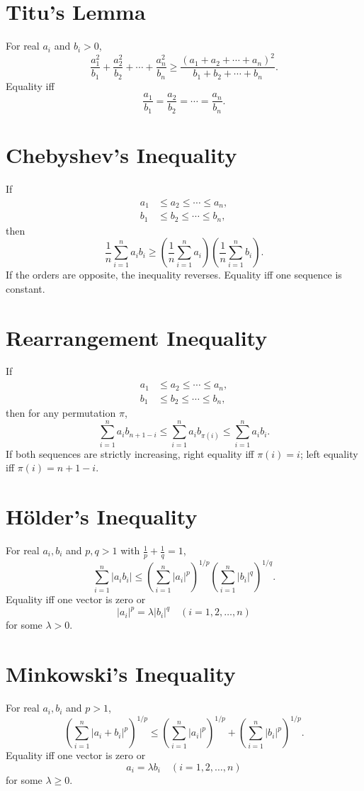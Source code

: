 \documentclass[11pt]{article}
\begin{document}
\section*{Titu's Lemma}
For real $a_i$ and $b_i>0$,
\[
    \frac{a_1^2}{b_1}+\frac{a_2^2}{b_2}+\cdots+\frac{a_n^2}{b_n}
    \geq
    \frac{(a_1+a_2+\cdots+a_n)^2}{b_1+b_2+\cdots+b_n}.
\]
Equality iff
\[
    \frac{a_1}{b_1}=\frac{a_2}{b_2}=\cdots=\frac{a_n}{b_n}.
\]

\section*{Chebyshev's Inequality}
If
\[
    \begin{aligned}
        a_1&\leq a_2\leq \cdots\leq a_n,\\
        b_1&\leq b_2\leq \cdots\leq b_n,
    \end{aligned}
\]
then
\[
    \frac{1}{n}\sum_{i=1}^n a_ib_i
    \geq
    \left(\frac{1}{n}\sum_{i=1}^n a_i\right)
    \left(\frac{1}{n}\sum_{i=1}^n b_i\right).
\]
If the orders are opposite, the inequality reverses. Equality iff one sequence is constant.

\section*{Rearrangement Inequality}
If
\[
    \begin{aligned}
        a_1&\leq a_2\leq \cdots\leq a_n,\\
        b_1&\leq b_2\leq \cdots\leq b_n,
    \end{aligned}
\]
then for any permutation $\pi$,
\[
    \sum_{i=1}^n a_ib_{n+1-i}
    \leq
    \sum_{i=1}^n a_ib_{\pi(i)}
    \leq
    \sum_{i=1}^n a_ib_i.
\]
If both sequences are strictly increasing, right equality iff $\pi(i)=i$; left equality iff $\pi(i)=n+1-i$.

\section*{H\"older's Inequality}
For real $a_i,b_i$ and $p,q>1$ with $\frac{1}{p}+\frac{1}{q}=1$,
\[
    \sum_{i=1}^n |a_ib_i|
    \leq
    \left(\sum_{i=1}^n |a_i|^p\right)^{1/p}
    \left(\sum_{i=1}^n |b_i|^q\right)^{1/q}.
\]
Equality iff one vector is zero or
\[
    |a_i|^p=\lambda |b_i|^q \quad (i=1,2,\ldots,n)
\]
for some $\lambda>0$.

\section*{Minkowski's Inequality}
For real $a_i,b_i$ and $p>1$,
\[
    \left(\sum_{i=1}^n |a_i+b_i|^p\right)^{1/p}
    \leq
    \left(\sum_{i=1}^n |a_i|^p\right)^{1/p}
    +
    \left(\sum_{i=1}^n |b_i|^p\right)^{1/p}.
\]
Equality iff one vector is zero or
\[
    a_i=\lambda b_i \quad (i=1,2,\ldots,n)
\]
for some $\lambda\geq 0$.
\end{document}
